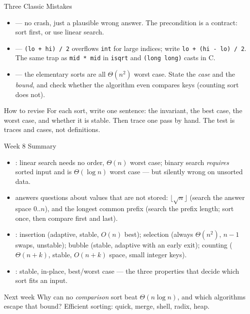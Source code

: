 \documentclass[aspectratio=169]{beamer}
\begin{document}
\begin{frame}{Three Classic Mistakes}
  \begin{itemize}
    \item {} --- no crash, just a
      plausible wrong answer. The precondition is a contract: sort first, or
      use linear search.
    \item {} ---
      \texttt{(lo + hi) / 2} overflows \texttt{int} for large indices; write
      \texttt{lo + (hi - lo) / 2}. The same trap as \texttt{mid * mid} in
      \texttt{isqrt} and \texttt{(long long)} casts in C.
    \item {} ---
      the elementary sorts are all $\Theta(n^2)$ worst case. State the
      \emph{case} and the \emph{bound}, and check whether the algorithm even
      compares keys (counting sort does not).
  \end{itemize}
  \begin{exampleblock}{How to revise}
    For each sort, write one sentence: the invariant, the best case, the
    worst case, and whether it is stable. Then trace one pass by hand. The
    test is traces and cases, not definitions.
  \end{exampleblock}
\end{frame}

\begin{frame}{Week 8 Summary}
  \begin{itemize}
    \item {}: linear search needs no order, $\Theta(n)$
      worst case; binary search \emph{requires} sorted input and is
      $\Theta(\log n)$ worst case --- but silently wrong on unsorted data.
    \item {} answers questions about
      values that are not stored: $\lfloor \sqrt{n} \rfloor$ (search the
      answer space $0..n$), and the longest common prefix (search the prefix
      length; sort once, then compare first and last).
    \item {}: insertion (adaptive, stable, $O(n)$ best);
      selection (always $\Theta(n^2)$, $n-1$ swaps, unstable); bubble
      (stable, adaptive with an early exit); counting ($\Theta(n+k)$, stable,
      $O(n+k)$ space, small integer keys).
    \item {}: stable, in-place, best/worst case ---
      the three properties that decide which sort fits an input.
  \end{itemize}
  \begin{exampleblock}{Next week}
    Why can no \emph{comparison} sort beat $\Theta(n \log n)$, and which
    algorithms escape that bound? Efficient sorting: quick, merge, shell,
    radix, heap.
  \end{exampleblock}
\end{frame}
\end{document}
